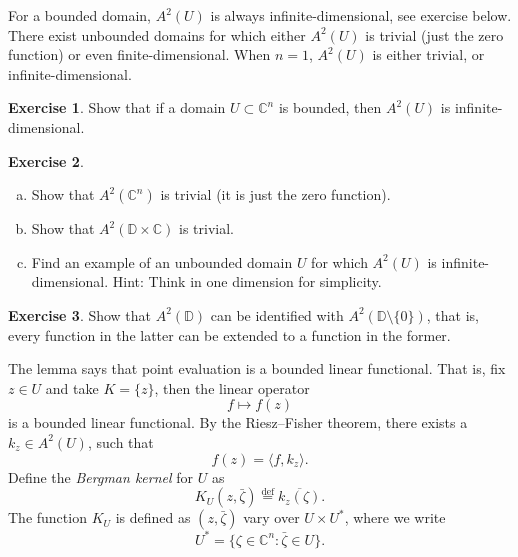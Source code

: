 \documentclass[12pt,openany]{book}
\newcommand{\linnprod}[2]{\langle #1 , #2 \rangle}
\newcommand{\C}{{\mathbb{C}}}
\newcommand{\D}{{\mathbb{D}}}
\newcommand{\myindex}[1]{#1\index{#1}}
\theoremstyle{plain}
\theoremstyle{remark}
\theoremstyle{definition}
\newenvironment{exbox}{%
    \def\FrameCommand{\vrule width 1pt \relax\hspace{10pt}}%
    \MakeFramed{\advance\hsize-\width\FrameRestore}%
}{%
    \endMakeFramed
}
\newenvironment{exparts}{%
    \leavevmode\begin{enumerate}[a),noitemsep,topsep=0pt,parsep=0pt,partopsep=0pt]
}{%
    \end{enumerate}
}
\theoremstyle{exercise}
\newtheorem{exercise}{Exercise}[section]
\theoremstyle{example}
\begin{document}
For a bounded domain, $A^2(U)$ is always infinite-dimensional, see exercise
below.  There exist unbounded domains for which either 
$A^2(U)$ is trivial (just the zero function) or even finite-dimensional.
When $n=1$, $A^2(U)$ is either trivial, or infinite-dimensional.

\begin{exbox}
\begin{exercise}
Show that if a domain $U \subset \C^n$ is bounded, then $A^2(U)$ is
infinite-dimensional.
\end{exercise}

\begin{exercise}
\begin{exparts}
\item
Show that $A^2(\C^n)$ is trivial (it is just the zero function).
\item
Show that $A^2(\D \times \C)$ is trivial.
\item
Find an example of an unbounded domain $U$ for which $A^2(U)$ is
infinite-dimensional.
Hint: Think in one dimension for simplicity.
\end{exparts}
\end{exercise}

\begin{exercise}
Show that $A^2(\D)$ can be identified with $A^2(\D \setminus \{ 0 \})$,
that is, every function in the latter can be extended to a function in the
former.
\end{exercise}
\end{exbox}

The lemma says that 
point evaluation is a bounded linear
functional.
That is, fix $z \in U$ and take $K= \{ z \}$, then the linear operator
\begin{equation*}
f \mapsto f(z)
\end{equation*}
is a bounded linear functional.  By the Riesz--Fisher theorem, there exists
a $k_z \in A^2(U)$, such that
\begin{equation*}
f(z) = \linnprod{f}{k_z} .
\end{equation*}
Define the \emph{\myindex{Bergman kernel}} for $U$ as
%
\begin{equation*}
K_U(z,\bar{\zeta}) \overset{\text{def}}{=} \overline{k_z(\zeta)} .
\end{equation*}
The function $K_U$ is defined as $(z,\bar{\zeta})$ vary over
%
$U \times U^*$, where we write
\begin{equation*}
U^* = \{ \zeta \in \C^n : \bar{\zeta} \in U \}.
\end{equation*}
\end{document}
